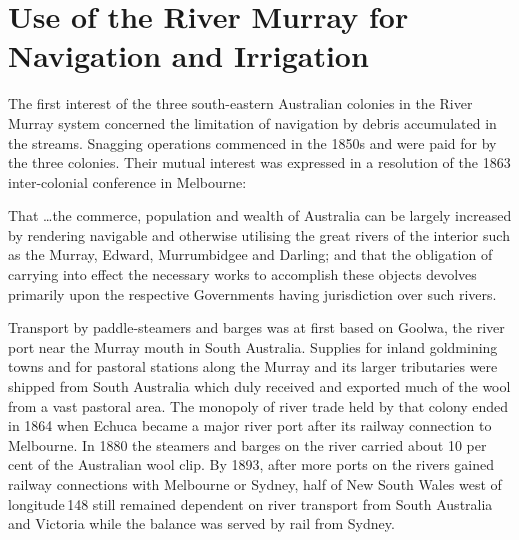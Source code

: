 
\setcounter{endnote}{0}

\chapter{Use of the River Murray for Navigation and Irrigation}
\label{ch:murray}


The first interest of the three south-eastern Australian colonies in
the River Murray system concerned the limitation of navigation by
debris accumulated in the streams.  Snagging operations commenced in
the 1850s and were paid for by the three colonies.  Their mutual
interest was expressed in a resolution of the 1863 inter-colonial
conference in Melbourne:
\begin{Quote}
	That \ldots the commerce, population and wealth of Australia
	can be largely increased by rendering navigable and otherwise
	utilising the great rivers of the interior such as the Murray,
	Edward, Murrumbidgee and Darling; and that the obligation of
	carrying into effect the necessary works to accomplish these
	objects devolves primarily upon the respective Governments
	having jurisdiction over such rivers.
\end{Quote}

Transport by paddle-steamers  and barges was at
first based on Gool\-wa,  the river port near the
Murray mouth in South Australia.  Supplies for inland goldmining towns
and for pastoral stations along the Murray and its larger tributaries
were shipped from South Australia which duly received and exported
much of the wool from a vast pastoral area.  The monopoly of river
trade held by that colony ended in 1864 when Echuca  became a major river port after its railway connection to
Melbourne.  In 1880 the steamers and barges on the river carried about
10 per cent of the Australian wool clip.  By 1893, after more ports on
the rivers gained railway connections with Melbourne or Sydney, half
of New South Wales west of longitude\,148 still remained dependent on
river transport from South Australia and Victoria while the balance
was served by rail from Sydney.

